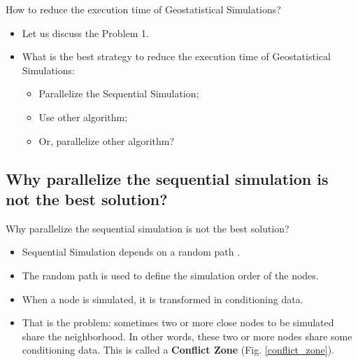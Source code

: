 \begin{frame}{How to reduce the execution time of Geostatistical Simulations?}
	\begin{itemize}
    	\item Let us discuss the Problem 1.
        \item What is the best strategy to reduce the execution time of Geostatistical Simulations:
        \begin{itemize}
        	\item Parallelize the Sequential Simulation;
        	\item Use other algorithm;
        	\item Or, parallelize other algorithm?
        \end{itemize}
    \end{itemize}
\end{frame}

\subsection{Why parallelize the sequential simulation is not the best solution?}
\begin{frame}{Why parallelize the sequential simulation is not the best solution?}
	\begin{itemize}
    	\item Sequential Simulation depends on a random path  \cite{goovaerts1997geostatistics}.
        \item The random path is used to define the simulation order of the nodes.
        \item When a node is simulated, it is transformed in conditioning data.
        \item That is the problem: sometimes two or more close nodes to be simulated share the neighborhood. In other words, these two or more nodes share some conditioning data. This is called a \textbf{Conflict Zone} (Fig. \ref{conflict_zone}).
    \end{itemize}
\end{frame}

